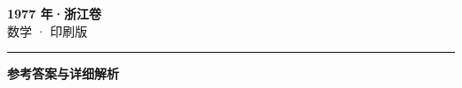 \documentclass[zihao=5, a4paper]{ctexart}
\begin{document}
\begin{center}
  {\Large\bfseries 1977 年·浙江卷}\\[4pt]
  {\large 数学 · 印刷版}
\end{center}
\medskip
{}

\par\bigskip\hrule\bigskip
{}
\begin{center}{\large\bfseries 参考答案与详细解析}\end{center}
\smallskip

\end{document}
